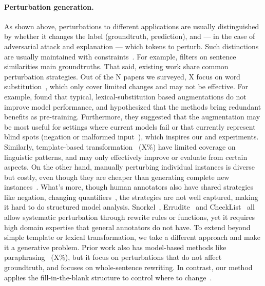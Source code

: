 \paragraph{Perturbation generation.}
As shown above, perturbations to different applications are usually distinguished by whether it changes the label (groundtruth, prediction), and --- in the case of adversarial attack and explanation --- which tokens to perturb.
Such distinctions are usually maintained with constraints~\cite{morris2020textattack}.
For example, filters on sentence similarities main groundtruths.
That said, existing work share common perturbation strategies.
Out of the N papers we surveyed, X focus on word substitution~\cite{alzantot2018generating, garg2020bae, hase2020evaluating, naik2018stress}, which only cover limited changes and may not be effective.
For example, \citet{longpre2020effective} found that typical, lexical-substitution based augmentations do not improve model performance, and hypothesized that the methods bring redundant benefits as pre-training.
Furthermore, they suggested that the augmentation may be most useful for settings where current models fail or that currently represent blind spots (\eg negation or malformed input~\cite{rogers2020primer, ettinger2020bert}), which inspires our \nli and \qqp experiments.
Similarly, template-based transformation~\cite{Geiger2019PosingFG, li2020linguistically, jiang2019avoiding} (X\%) have limited coverage on linguistic patterns, and may only effectively improve or evaluate from certain aspects.
On the other hand, manually perturbing individual instances is diverse but costly, even though they are cheaper than generating complete new instances~\cite{Khashabi2020MoreBF}.
What's more, though human annotators also have shared strategies like negation, changing quantifiers~\cite{kaushik2019learning, gardner2020contrast}, the strategies are not well captured, making it hard to do structured model analysis.
Snorkel~\cite{ratner2017snorkel}, Errudite~\cite{ratner2017snorkel} and CheckList~\cite{checklist:acl20} all allow systematic perturbation through rewrite rules or functions, yet it requires high domain expertise that general annotators do not have.
To extend beyond simple template or lexical transformation, we take a different approach and make it a generative problem.
Prior work also has model-based methods like paraphrasing~\cite{iyyer2018adversarial} (X\%), but it focus on perturbations that do not affect groundtruth, and focuses on whole-sentence rewriting.
In contrast, our method applies the fill-in-the-blank structure to control where to change~\cite{donahue2020enabling}.















